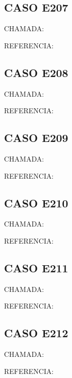 \documentclass{undftex}
\begin{document}
\begin{refsection}\section*{CASO E207}\noindent CHAMADA: \par\noindent REFERENCIA:\par\printbibliography[heading=none]\end{refsection}\clearpage
\begin{refsection}\section*{CASO E208}\noindent CHAMADA: \par\noindent REFERENCIA:\par\printbibliography[heading=none]\end{refsection}\clearpage
\begin{refsection}\section*{CASO E209}\noindent CHAMADA: \par\noindent REFERENCIA:\par\printbibliography[heading=none]\end{refsection}\clearpage
\begin{refsection}\section*{CASO E210}\noindent CHAMADA: \par\noindent REFERENCIA:\par\printbibliography[heading=none]\end{refsection}\clearpage
\begin{refsection}\section*{CASO E211}\noindent CHAMADA: \par\noindent REFERENCIA:\par\printbibliography[heading=none]\end{refsection}\clearpage
\begin{refsection}\section*{CASO E212}\noindent CHAMADA: \par\noindent REFERENCIA:\par\printbibliography[heading=none]\end{refsection}\clearpage
\end{document}
